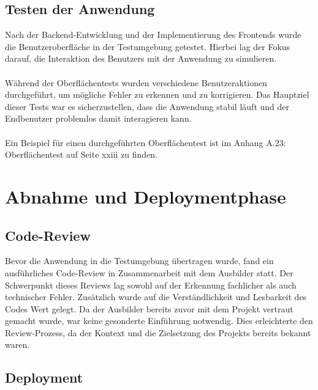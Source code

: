 \documentclass[a4paper,12pt]{article}
\begin{document}
\subsection{Testen der Anwendung}
Nach der Backend-Entwicklung und der Implementierung des Frontends wurde die Benutzeroberfläche in der Testumgebung getestet. Hierbei lag der Fokus darauf, die Interaktion des Benutzers mit der Anwendung zu simulieren. \\
\\
Während der Oberflächentests wurden verschiedene Benutzeraktionen durchgeführt, um mögliche Fehler zu erkennen und zu korrigieren. Das Hauptziel dieser Tests war es sicherzustellen, dass die Anwendung stabil läuft und der Endbenutzer problemlos damit interagieren kann.\\
\\
Ein Beispiel für einen durchgeführten Oberflächentest ist im Anhang A.23: Oberflächentest auf Seite xxiii zu finden.

\section{Abnahme und Deploymentphase}
\subsection{Code-Review}
Bevor die Anwendung in die Testumgebung übertragen wurde, fand ein ausführliches Code-Review in Zusammenarbeit mit dem Ausbilder statt. Der Schwerpunkt dieses Reviews lag sowohl auf der Erkennung fachlicher als auch technischer Fehler. Zusätzlich wurde auf die Verständlichkeit und Lesbarkeit des Codes Wert gelegt. Da der Ausbilder bereits zuvor mit dem Projekt vertraut gemacht wurde, war keine gesonderte Einführung notwendig. Dies erleichterte den Review-Prozess, da der Kontext und die Zielsetzung des Projekts bereits bekannt waren.

\subsection{Deployment}
\end{document}
